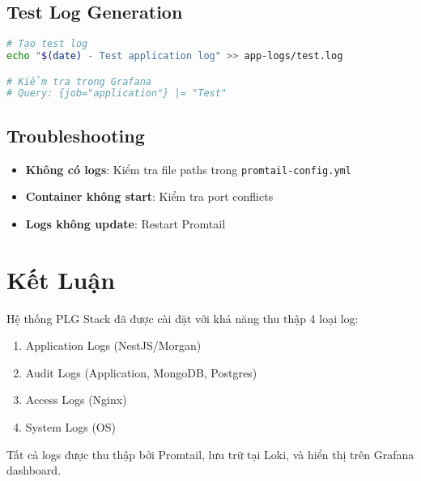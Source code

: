 \documentclass[a4paper,12pt]{article}
\begin{document}
\subsection{Test Log Generation}

\begin{lstlisting}[language=bash]
# Tạo test log
echo "$(date) - Test application log" >> app-logs/test.log

# Kiểm tra trong Grafana
# Query: {job="application"} |= "Test"
\end{lstlisting}

\subsection{Troubleshooting}

\begin{itemize}
    \item \textbf{Không có logs}: Kiểm tra file paths trong \texttt{promtail-config.yml}
    \item \textbf{Container không start}: Kiểm tra port conflicts
    \item \textbf{Logs không update}: Restart Promtail
\end{itemize}

\section{Kết Luận}

Hệ thống PLG Stack đã được cài đặt với khả năng thu thập 4 loại log:
\begin{enumerate}
    \item Application Logs (NestJS/Morgan)
    \item Audit Logs (Application, MongoDB, Postgres)
    \item Access Logs (Nginx)
    \item System Logs (OS)
\end{enumerate}

Tất cả logs được thu thập bởi Promtail, lưu trữ tại Loki, và hiển thị trên Grafana dashboard.
\end{document}
